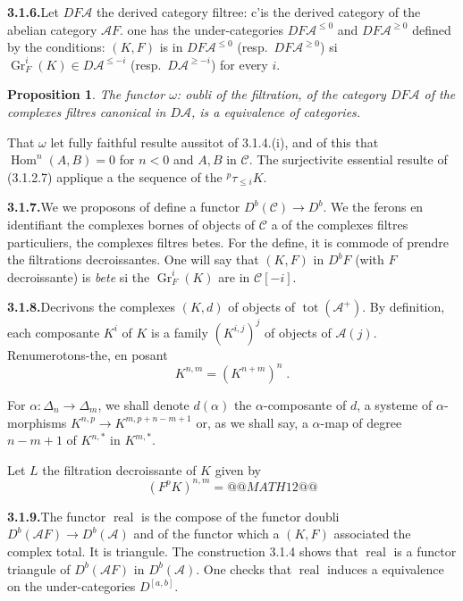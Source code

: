 \documentclass[12pt,a4paper]{article}
\theoremstyle{plain}
\newtheorem{proposition}[theorem]{Proposition}
\theoremstyle{definition}
\DeclareMathOperator{\Hom}{Hom}
\DeclareMathOperator{\real}{real}
\DeclareMathOperator{\Gr}{Gr}
\DeclareMathOperator{\tot}{tot}
\begin{document}
\smallskip
\noindent\textbf{3.1.6.}\quad Let $DF\mathcal{A}$ the derived category filtree: c'is the derived category of the abelian category $\mathcal{A}F$. one has the under-categories $DF\mathcal{A}^{\leqslant 0}$ and $DF\mathcal{A}^{\geqslant 0}$ defined by the conditions: $(K, F)$ is in $DF\mathcal{A}^{\leqslant 0}$ (resp.\ $DF\mathcal{A}^{\geqslant 0}$) si $\Gr_F^i(K) \in D\mathcal{A}^{\leqslant -i}$ (resp.\ $D\mathcal{A}^{\geqslant -i}$) for every $i$.

\begin{proposition}\label{prop:3.1.6}
The functor $\omega$: oubli of the filtration, of the category $DF\mathcal{A}$ of the complexes filtres canonical in $D\mathcal{A}$, is a equivalence of categories.
\end{proposition}

That $\omega$ let fully faithful resulte aussitot of 3.1.4.(i), and of this that $\Hom^n(A,B) = 0$ for $n < 0$ and $A, B$ in $\mathcal{C}$. The surjectivite essential resulte of (3.1.2.7) applique a the sequence of the ${}^p \tau_{\leqslant i} K$.

\smallskip
\noindent\textbf{3.1.7.}\quad We we proposons of define a functor $D^b(\mathcal{C}) \to D^b$. We the ferons en identifiant the complexes bornes of objects of $\mathcal{C}$ a of the complexes filtres particuliers, the complexes filtres betes. For the define, it is commode of prendre the filtrations decroissantes. One will say that $(K, F)$ in $D^bF$ (with $F$ decroissante) is \emph{bete} si the $\Gr_F^i(K)$ are in $\mathcal{C}[-i]$.

\smallskip
\noindent\textbf{3.1.8.}\quad Decrivons the complexes $(K, d)$ of objects of $\tot(\mathcal{A}^+)$. By definition, each composante $K^i$ of $K$ is a family $(K^{i,j})^j$ of objects of $\mathcal{A}(j)$. Renumerotons-the, en posant
\[
K^{n,m} = (K^{n+m})^n\;.
\]

For $\alpha : \Delta_n \to \Delta_m$, we shall denote $d(\alpha)$ the $\alpha$-composante of $d$, a systeme of $\alpha$-morphisms $K^{n,p} \to K^{m, p+n-m+1}$ or, as we shall say, a $\alpha$-map of degree $n-m+1$ of $K^{n,*}$ in $K^{m,*}$.

Let $L$ the filtration decroissante of $K$ given by
\[
(F^p K)^{n,m} = @@MATH12@@
\]

\smallskip
\noindent\textbf{3.1.9.}\quad The functor $\real$ is the compose of the functor doubli $D^b(\mathcal{A}F) \to D^b(\mathcal{A})$ and of the functor which a $(K, F)$ associated the complex total. It is triangule. The construction 3.1.4 shows that $\real$ is a functor triangule of $D^b(\mathcal{A}F)$ in $D^b(\mathcal{A})$. One checks that $\real$ induces a equivalence on the under-categories $D^{[a,b]}$.
\end{document}
